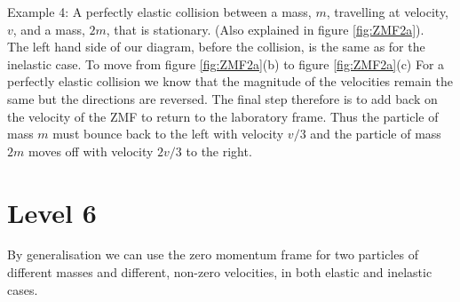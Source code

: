 \noindent Example 4: A perfectly elastic collision between a mass, $m$, travelling at velocity, $v$, and a mass, $2m$, that is stationary. (Also explained in figure \ref{fig:ZMF2a}).\\

\noindent The left hand side of our diagram, before the collision, is the same as for the inelastic case.   \nll  To move from figure \ref{fig:ZMF2a}(b) to figure \ref{fig:ZMF2a}(c)  For a perfectly elastic collision we know that the magnitude of the velocities remain the same but the directions are reversed. 
\nll The final step therefore is to add back on the velocity of the ZMF to return to the laboratory frame.  Thus the particle of mass $m$ must bounce back to the left with velocity $v/3$ and the particle of mass $2m$ moves off with velocity $2v/3$ to the right.

\section{Level 6}
By generalisation we can use the zero momentum frame for two particles of different masses and different, non-zero velocities, in both elastic and inelastic cases.

